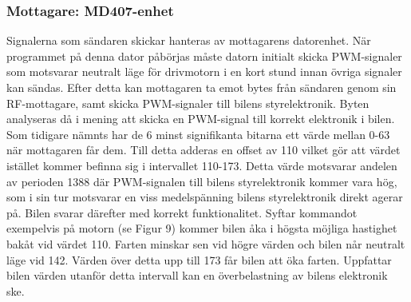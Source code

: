 \documentclass[a4paper]{article}
\begin{document}

\subsubsection{Mottagare: MD407-enhet}
Signalerna som sändaren skickar hanteras av mottagarens datorenhet. När programmet på denna dator påbörjas måste datorn initialt skicka PWM-signaler som motsvarar neutralt läge för drivmotorn i en kort stund innan övriga signaler kan sändas. Efter detta kan mottagaren ta emot bytes från sändaren genom sin RF-mottagare, samt skicka PWM-signaler till bilens styrelektronik. Byten analyseras då i mening att skicka en PWM-signal till korrekt elektronik i bilen. Som tidigare nämnts har de 6 minst signifikanta bitarna ett värde mellan 0-63 när mottagaren får dem. Till detta adderas en offset av 110 vilket gör att värdet istället kommer befinna sig i intervallet 110-173. Detta värde motsvarar andelen av perioden 1388 där PWM-signalen till bilens styrelektronik kommer vara hög, som i sin tur motsvarar en viss medelspänning bilens styrelektronik direkt agerar på. Bilen svarar därefter med korrekt funktionalitet. Syftar kommandot exempelvis på motorn (se Figur 9) kommer bilen åka i högsta möjliga hastighet bakåt vid värdet 110. Farten minskar sen vid högre värden och bilen når neutralt läge vid 142. Värden över detta upp till 173 får bilen att öka farten. Uppfattar bilen värden utanför detta intervall kan en överbelastning av bilens elektronik ske. 

\end{document}
